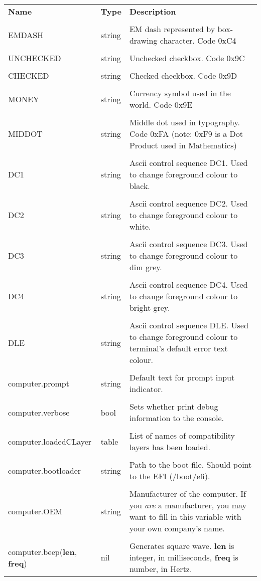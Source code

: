 \begin{tabularx}{\textwidth}{l l X}
	\textbf{\large Name} & \textbf{\large Type} & \textbf{\large Description}
	\\ \\
	\endhead
	\unemph{\_G.}EMDASH & string & EM dash represented by box-drawing character. Code 0xC4
	\\ \\
	\unemph{\_G.}UNCHECKED & string & Unchecked checkbox. Code 0x9C
	\\ \\
	\unemph{\_G.}CHECKED & string & Checked checkbox. Code 0x9D
	\\ \\
	\unemph{\_G.}MONEY & string & Currency symbol used in the world. Code 0x9E
	\\ \\
	\unemph{\_G.}MIDDOT & string & Middle dot used in typography. Code 0xFA (note: 0xF9 is a Dot Product used in Mathematics)
	\\ \\
	\unemph{\_G.}DC1 & string & Ascii control sequence DC1. Used to change foreground colour to black.
	\\ \\
	\unemph{\_G.}DC2 & string & Ascii control sequence DC2. Used to change foreground colour to white.
	\\ \\
	\unemph{\_G.}DC3 & string & Ascii control sequence DC3. Used to change foreground colour to dim grey.
	\\ \\
	\unemph{\_G.}DC4 & string & Ascii control sequence DC4. Used to change foreground colour to bright grey.
	\\ \\
	\unemph{\_G.}DLE & string & Ascii control sequence DLE. Used to change foreground colour to terminal's default error text colour.
	\\ \\
	computer.prompt & string & Default text for prompt input indicator.
	\\ \\
	computer.verbose & bool & Sets whether print debug information to the console.
	\\ \\
	computer.loadedCLayer & table & List of names of compatibility layers has been loaded.
	\\ \\
	computer.bootloader & string & Path to the boot file. Should point to the EFI (/boot/efi).
	\\ \\
	computer.OEM & string & Manufacturer of the computer. If you \emph{are} a manufacturer, you may want to fill in this variable with your own company's name.
	\\ \\
	computer.beep(\textbf{len}, \textbf{freq}) & nil & Generates square wave. \textbf{len} is integer, in milliseconds, \textbf{freq} is number, in Hertz.
\end{tabularx}